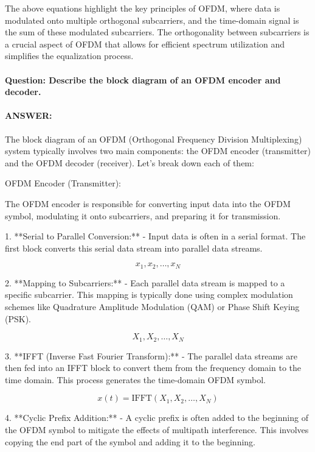 \documentclass[colorlinks,11pt,a4paper,normalphoto,withhyper,ragged2e]{altareport}
\begin{document}
				The above equations highlight the key principles of OFDM, where data is modulated onto multiple orthogonal subcarriers, and the time-domain signal is the sum of these modulated subcarriers. The orthogonality between subcarriers is a crucial aspect of OFDM that allows for efficient spectrum utilization and simplifies the equalization process.
				
				
				
				
				\paragraph{Question: Describe the block diagram of an OFDM encoder and decoder.}
				\paragraph{ANSWER:}
				
				The block diagram of an OFDM (Orthogonal Frequency Division Multiplexing) system typically involves two main components: the OFDM encoder (transmitter) and the OFDM decoder (receiver). Let's break down each of them:
				
				OFDM Encoder (Transmitter):
				
				The OFDM encoder is responsible for converting input data into the OFDM symbol, modulating it onto subcarriers, and preparing it for transmission.
				
				1. **Serial to Parallel Conversion:**
				- Input data is often in a serial format. The first block converts this serial data stream into parallel data streams.
				
				\[ x_1, x_2, \ldots, x_N \]
				
				2. **Mapping to Subcarriers:**
				- Each parallel data stream is mapped to a specific subcarrier. This mapping is typically done using complex modulation schemes like Quadrature Amplitude Modulation (QAM) or Phase Shift Keying (PSK).
				
				\[ X_1, X_2, \ldots, X_N \]
				
				3. **IFFT (Inverse Fast Fourier Transform):**
				- The parallel data streams are then fed into an IFFT block to convert them from the frequency domain to the time domain. This process generates the time-domain OFDM symbol.
				
				\[ x(t) = \text{IFFT}(X_1, X_2, \ldots, X_N) \]
				
				4. **Cyclic Prefix Addition:**
				- A cyclic prefix is often added to the beginning of the OFDM symbol to mitigate the effects of multipath interference. This involves copying the end part of the symbol and adding it to the beginning.
				
\end{document}
